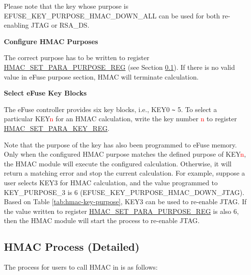 \documentclass[main\_\_EN.tex]{subfiles}
\begin{document}
Please note that the key whose purpose is EFUSE\_KEY\_PURPOSE\_HMAC\_DOWN\_ALL can be used for both re-enabling JTAG or RSA\_DS.




\textbf{Configure HMAC Purposes}
\label{sec:hmac-config-purposes}

The correct purpose has to be written to register \hyperref[regdesc:HMACSETPARAPURPOSEREG]{HMAC\_SET\_PARA\_PURPOSE\_REG} (see Section \ref{sec:hmac-process-detailed}). If there is no valid value in eFuse purpose section, HMAC will terminate calculation.

\textbf{Select eFuse Key Blocks}
\label{sec:hmac-config-efuse-key}

The eFuse controller provides six key blocks, i.e., KEY0 \verb+~+ 5. To select a particular KEY\textcolor{red}{n} for an HMAC calculation, write the key number \textcolor{red}{n} to register \hyperref[regdesc:HMACSETPARAKEYREG]{HMAC\_SET\_PARA\_KEY\_REG}.

Note that the purpose of the key has also been programmed to eFuse memory. Only when the configured HMAC purpose matches the defined purpose of KEY\textcolor{red}{n}, the HMAC module will execute the configured calculation. Otherwise, it will return a matching error and stop the current calculation.
For example, suppose a user selects KEY3 for HMAC calculation, and the value programmed to KEY\_PURPOSE\_3 is 6 (EFUSE\_KEY\_PURPOSE\_HMAC\_DOWN\_JTAG). Based on Table \ref{tab:hmac-key-purpose}, KEY3 can be used to re-enable JTAG. If the value written to register \hyperref[regdesc:HMACSETPARAPURPOSEREG]{HMAC\_SET\_PARA\_PURPOSE\_REG} is also 6, then the HMAC module will start the process to re-enable JTAG.


\subsection{HMAC Process (Detailed)}
\label{sec:hmac-process-detailed}
The process for users to call HMAC in \chipname{} is as follows:
\end{document}
